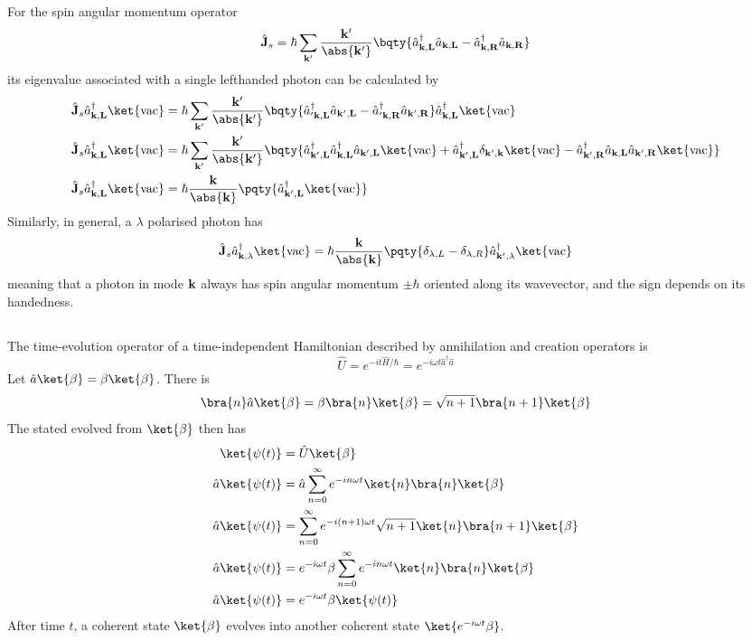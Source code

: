 \documentclass[12pt]{article}
\begin{document}
        For the spin angular momentum operator \[
            \hat{\bf J}_s = \hbar \sum_{\bf k'} \frac{\bf k'}{\abs{\bf k'}}\bqty{\hat{a}^\dagger_{\bf k,L} \hat{a}_{\bf k,L} - \hat{a}^\dagger_{\bf k,R} \hat{a}_{\bf k,R}}
        \]
        its eigenvalue associated with a single lefthanded photon can be calculated by \begin{align*}
            \hat{\bf J}_s \hat{a}^\dagger_{\bf k,L}\mathrm{\ket{vac} } &= \hbar \sum_{\bf k'} \frac{\bf k'}{\abs{\bf k'}}\bqty{\hat{a}^\dagger_{\bf 'k,L} \hat{a}_{\bf k',L} - \hat{a}^\dagger_{\bf 'k,R} \hat{a}_{\bf k',R}} \hat{a}^\dagger_{\bf k,L}\mathrm{\ket{vac} }\\
            \hat{\bf J}_s \hat{a}^\dagger_{\bf k,L}\mathrm{\ket{vac} } &= \hbar \sum_{\bf k'} \frac{\bf k'}{\abs{\bf k'}}\bqty{\hat{a}^\dagger_{\bf k',L} \hat{a}^\dagger_{\bf k,L} \hat{a}_{\bf k',L}  \mathrm{\ket{vac} } + \hat{a}^\dagger_{\bf k',L} \delta_{\bf k',\bf k} \mathrm{\ket{vac} } - \hat{a}^\dagger_{\bf k',R}\hat{a}_{\bf k,L} \hat{a}_{\bf k',R} \mathrm{\ket{vac} }} \\
            \hat{\bf J}_s \hat{a}^\dagger_{\bf k,L}\mathrm{\ket{vac} } &= \hbar \frac{\bf k}{\abs{\bf k}} \pqty{\hat{a}^\dagger_{\bf k',L} \mathrm{\ket{vac} }} 
        \end{align*}
        Similarly, in general, a \(\lambda\) polarised photon has \[
            \hat{\bf J}_s \hat{a}^\dagger_{\bf k,\lambda}\mathrm{\ket{vac} } = \hbar \frac{\bf k}{\abs{\bf k}} \pqty{\delta_{\lambda,L} - \delta_{\lambda,R}} \hat{a}^\dagger_{\bf k',\lambda} \mathrm{\ket{vac} }
        \]
        meaning that a photon in mode \(\bf k\) always has spin angular momentum \(\pm \hbar\) oriented along its wavevector, and the sign depends on its handedness.
        \subsection{} The time-evolution operator of a time-independent Hamiltonian described by annihilation and creation operators is \[
            \hat{U} = e^{ -it\hat{H}/\hbar} =e^{ -i\omega t\hat{a}^\dagger \hat{a} }
        \]
        Let \(\hat{a}\ket{\beta} = \beta \ket{\beta} \). There is \[
            \bra{n} \hat{a} \ket{\beta} = \beta \bra{n}  \ket{\beta} = \sqrt{n + 1} \bra{n + 1} \ket{\beta}   
        \]  The stated evolved from \(\ket{\beta} \) then has \begin{align*}
            \ket{\psi(t)}  &= \hat{U} \ket{\beta}\\
            \hat{a}\ket{\psi(t)}  &= \hat{a}\sum_{n = 0}^{\infty}e^{ -in\omega t} \ket{n} \bra{n} \ket{\beta}\\
            \hat{a}\ket{\psi(t)}  &= \sum_{n = 0}^{\infty}e^{ -i(n + 1)\omega t} \sqrt{n + 1}\ket{n} \bra{n + 1} \ket{\beta}\\
            \hat{a}\ket{\psi(t)}  &= e^{ - i\omega t} \beta \sum_{n = 0}^{\infty}e^{ -in\omega t} \ket{n} \bra{n} \ket{\beta} \\
            \hat{a}\ket{\psi(t)}  &= e^{ - i\omega t} \beta \ket{\psi(t)} 
        \end{align*}
        After time \(t\), a coherent state \(\ket{\beta} \) evolves into another coherent state \(\ket{e^{ - i\omega t}\beta} \).
\end{document}
